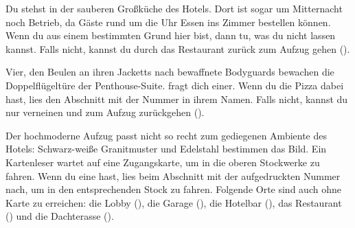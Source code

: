 {	%
	Du stehst in der sauberen Großküche des Hotels. Dort ist sogar um Mitternacht noch Betrieb, da Gäste rund um die Uhr Essen ins Zimmer bestellen können. Wenn du aus einem bestimmten Grund hier bist, dann tu, was du nicht lassen kannst. Falls nicht, kannst du durch das Restaurant zurück zum Aufzug gehen ().

	Vier, den Beulen an ihren Jacketts nach bewaffnete Bodyguards bewachen die Doppelflügeltüre der Penthouse-Suite.  fragt dich einer. Wenn du die Pizza dabei hast, lies den Abschnitt mit der Nummer in ihrem Namen. Falls nicht, kannst du nur verneinen und zum Aufzug zurückgehen ().

	Der hochmoderne Aufzug passt nicht so recht zum gediegenen Ambiente des Hotels: Schwarz-weiße Granitmuster und Edelstahl bestimmen das Bild. Ein Kartenleser wartet auf eine Zugangskarte, um in die oberen Stockwerke zu fahren. Wenn du eine hast, lies beim Abschnitt mit der aufgedruckten Nummer nach, um in den entsprechenden Stock zu fahren. Folgende Orte sind auch ohne Karte zu erreichen: die Lobby (), die Garage (), die Hotelbar (), das Restaurant () und die Dachterasse ().

}
